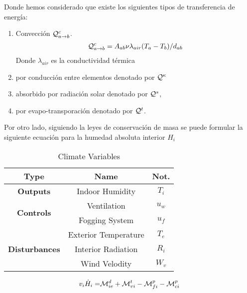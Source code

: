 \documentclass[5p,twocolumn]{elsarticle}
\begin{document}
Donde hemos considerado que existe los siguientes tipos de transferencia de energía: 
\begin{enumerate}
    \item Convección $\mathcal{Q}^c_{a\to b}$.
    \begin{gather}
        \mathcal{Q}^c_{a\to b} = A_{ab}\nu\lambda_{air} (T_a - T_b)/d_{ab}
    \end{gather} 
    Donde $\lambda_{air}$ es la conductividad térmica 
    \item por conducción entre elementos denotado por $\mathcal{Q}^\kappa$
    \item absorbido por radiación solar denotado por $\mathcal{Q}^s$, 
    \item por evapo-transporación denotado por $\mathcal{Q}^{t}$.
\end{enumerate}

Por otro lado, siguiendo la leyes de conservación de masa se puede formular la siguiente ecuación para la humedad absoluta interior $H_i$

\begin{table}[ht!]
    \centering
    \small
    \begin{tabular}{ccc}
        \textbf{Type} & \textbf{Name} & \textbf{Not.} \\ \hline
        \multirow{1}{*}{\textbf{Outputs}}       & Indoor Humidity       & $T_i$  \\ \hline
        \multirow{2}{*}{\textbf{Controls}}      & Ventilation           & $u_w$ \\
                                                & Fogging System        & $u_f$  \\ \hline   
        \multirow{3}{*}{\textbf{Disturbances}}  & Exterior Temperature  & $T_e$ \\
                                                & Interior Radiation    & $R_i$ \\
                                                & Wind Velodity         & $W_v$ \\ \hline
    \end{tabular}
    \caption{Climate Variables}
\end{table}


\begin{gather}
    \begin{aligned}
        v_{i} \dot{H}_i =&\mathcal{M}^d_{ie} + \mathcal{M}^t_{vi} - \mathcal{M}_{fi}^p  - \mathcal{M}_{ci}^p\\
    \end{aligned}
\end{gather}
\end{document}
